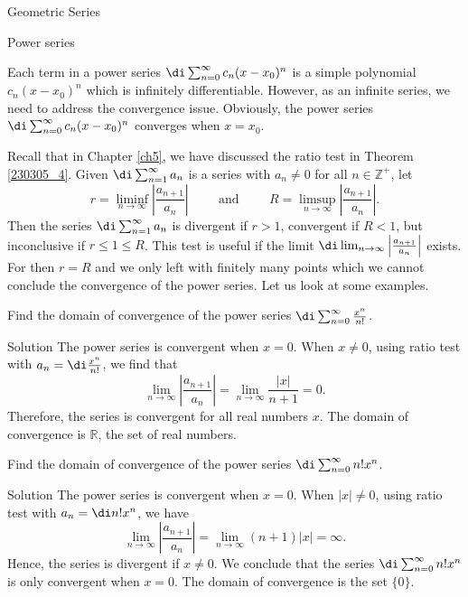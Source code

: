 \begin{example}[label=230305_16]{Geometric Series}
\begin{example}[label=230304_9]{}
\begin{definition}{Power series}
\end{definition}
Each term in a power series $\di \sum_{n=0}^{\infty}c_n(x-x_0)^n$ is a simple polynomial $c_n(x-x_0)^n$ which is infinitely differentiable. However, as an infinite series, we need to address the convergence issue. Obviously, the power series $\di \sum_{n=0}^{\infty}c_n(x-x_0)^n$  converges when $x=x_0$. 

Recall that in Chapter \ref{ch5}, we have discussed the ratio test in Theorem \ref{230305_4}. Given $\di\sum_{n=1}^{\infty}a_n$ is a series with $a_n\neq 0$ for all $n\in\mathbb{Z}^+$, let
\[r=\liminf_{n\to\infty}\left|\frac{a_{n+1}}{a_n}\right|\hspace{1cm}\text{and}\hspace{1cm} R=\limsup_{n\to\infty}\left|\frac{a_{n+1}}{a_n}\right|.\]
Then the series $\di\sum_{n=1}^{\infty}a_n$  is divergent if $r>1$, convergent if $R<1$, but inconclusive if $r\leq 1\leq R$.
This test is useful if the limit $\di\lim_{n\to\infty}\left|\frac{a_{n+1}}{a_n}\right|$ exists. For then $r=R$ and we only left with finitely many points which we cannot conclude the convergence of the power series.
Let us look at some examples.
\begin{example}[label=230305_1]{}
Find the domain of convergence of the power series $\di \sum_{n=0}^{\infty}\frac{x^n}{n!}$.
\end{example}
\begin{solution}{Solution}
The power series is convergent when $x=0$. When $x\neq 0$,  using ratio test with $a_n=\di \frac{x^n}{n!}$, we find that
\[ \lim_{n\to\infty}\left|\frac{a_{n+1}}{a_n}\right|=\lim_{n\to\infty}\frac{|x|}{n+1}=0.\] 
Therefore, the series is convergent for all real numbers $x$. The domain of convergence is $\mathbb{R}$, the set of real numbers.
\end{solution}

\begin{example}[label=230305_2]{}
Find the domain of convergence of the power series $\di \sum_{n=0}^{\infty}n!x^n $.
\end{example}
\begin{solution}{Solution}
The power series is convergent when $x=0$. When $|x|\neq 0$, using ratio test with $a_n=\di  n!x^n$, we have 
\[ \lim_{n\to\infty}\left|\frac{a_{n+1}}{a_n}\right|=\lim_{n\to\infty}(n+1)|x|=\infty.\] Hence, the series is divergent if $x\neq 0$.
We conclude that the  series $\di \sum_{n=0}^{\infty}n!x^n $ is only convergent when $x=0$. The domain of convergence is the set $\{0\}$.
\end{solution}


\end{example}
\end{example}
